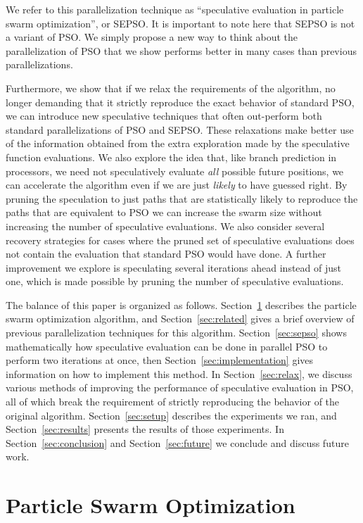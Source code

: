 \documentclass[smallcondensed]{svjour3}
\renewcommand{\sec}[1]{Section~\ref{sec:#1}}
\begin{document}
We refer to this parallelization technique as ``speculative evaluation in
particle swarm optimization'', or SEPSO.  It is important to note here that
SEPSO is not a variant of PSO.  We simply propose a new way to think about the
parallelization of PSO that we show performs better in many cases than previous
parallelizations.

Furthermore, we show that if we relax the requirements of the algorithm, no
longer demanding that it strictly reproduce the exact behavior of standard PSO,
we can introduce new speculative techniques that often out-perform both
standard parallelizations of PSO and SEPSO.  These relaxations make better use
of the information obtained from the extra exploration made by the speculative
function evaluations.  We also explore the idea that, like branch prediction in
processors, we need not speculatively evaluate \emph{all} possible future
positions, we can accelerate the algorithm even if we are just \emph{likely} to
have guessed right.  By pruning the speculation to just paths that are
statistically likely to reproduce the paths that are equivalent to PSO we can
increase the swarm size without increasing the number of speculative
evaluations.  We also consider several recovery strategies for cases where the
pruned set of speculative evaluations does not contain the evaluation that
standard PSO would have done.  A further improvement we explore is speculating
several iterations ahead instead of just one, which is made possible by pruning
the number of speculative evaluations.

The balance of this paper is organized as follows. \sec{pso} describes the
particle swarm optimization algorithm, and \sec{related} gives a brief overview
of previous parallelization techniques for this algorithm.  \sec{sepso} shows
mathematically how speculative evaluation can be done in parallel PSO to
perform two iterations at once, then \sec{implementation} gives information on
how to implement this method.  In \sec{relax}, we discuss various methods of
improving the performance of speculative evaluation in PSO, all of which break
the requirement of strictly reproducing the behavior of the original algorithm.
\sec{setup} describes the experiments we ran, and \sec{results} presents the
results of those experiments.  In \sec{conclusion} and \sec{future} we conclude
and discuss future work.

\section{Particle Swarm Optimization}
\label{sec:pso}
\end{document}
